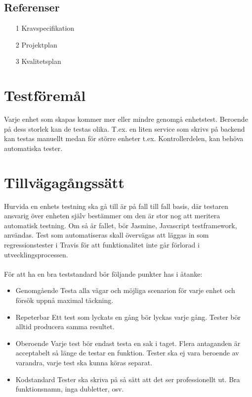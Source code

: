 \documentclass[10pt]{article}
\begin{document}
	\subsection{Referenser}
		\begin{itemize}
		\item [1] Kravspecifikation
		\item [2] Projektplan
		\item [3] Kvalitetsplan
		\end{itemize}

	
\section{Testföremål}
	Varje enhet som skapas kommer mer eller mindre genomgå enhetstest. Beroende på dess storlek kan de testas olika. T.ex. en liten service som skrivs på backend kan testas manuellt medan för större enheter t.ex. Kontrollerdelen, kan behöva automatiska tester.
	\\
	
	


\section{Tillvägagångssätt}
	Hurvida en enhets testning ska gå till är på fall till fall basis, där testaren ansvarig över enheten själv bestämmer om den är stor nog att meritera automatisk testning.
	Om så är fallet, bör {\color{red}Jasmine}, Javascript testframework, användas. Test som automatiseras skall övervägas att läggas in som regressionstester i Travis för att funktionalitet inte går förlorad i utvecklingsprocessen. \\
	\\
	För att ha en bra teststandard bör följande punkter has i åtanke:
	\begin {itemize}
	 \item [Genomgående] Testa alla vägar och möjliga scenarion för varje enhet och försök uppnå maximal täckning.
	 \item [Repeterbar] Ett test som lyckats en gång bör lyckas varje gång. Tester bör alltid producera samma resultet.
	 \item [Oberoende] Varje test bör endast testa en sak i taget. Flera antaganden är acceptabelt så länge de testar en funktion. Tester ska ej vara beroende av varandra, varje test ska kunna köras separat.
	 \item [Kodstandard] Tester ska skriva på så sätt att det ser professionellt ut. Bra funktionsnamn, inga dubletter, osv.
	\end {itemize}
\end{document}
